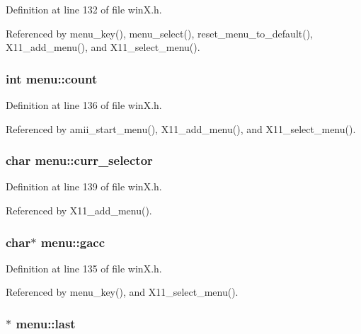Definition at line 132 of file win\+X.\+h.



Referenced by menu\+\_\+key(), menu\+\_\+select(), reset\+\_\+menu\+\_\+to\+\_\+default(), X11\+\_\+add\+\_\+menu(), and X11\+\_\+select\+\_\+menu().

\hypertarget{structmenu_a3d6c8d06c1b134f60244b4449a094d16}{
\subsubsection[{count}]{\setlength{\rightskip}{0pt plus 5cm}int menu\+::count}}\label{structmenu_a3d6c8d06c1b134f60244b4449a094d16}


Definition at line 136 of file win\+X.\+h.



Referenced by amii\+\_\+start\+\_\+menu(), X11\+\_\+add\+\_\+menu(), and X11\+\_\+select\+\_\+menu().

\hypertarget{structmenu_a06cdb274941f7ed31c60fc8e8389cd6b}{
\subsubsection[{curr\+\_\+selector}]{\setlength{\rightskip}{0pt plus 5cm}char menu\+::curr\+\_\+selector}}\label{structmenu_a06cdb274941f7ed31c60fc8e8389cd6b}


Definition at line 139 of file win\+X.\+h.



Referenced by X11\+\_\+add\+\_\+menu().

\hypertarget{structmenu_add1624fb9ee5a8b54a7c409af24d0318}{
\subsubsection[{gacc}]{ char$\ast$ menu\+::gacc}}\label{structmenu_add1624fb9ee5a8b54a7c409af24d0318}


Definition at line 135 of file win\+X.\+h.



Referenced by menu\+\_\+key(), and X11\+\_\+select\+\_\+menu().

\hypertarget{structmenu_aab6cdb5421f24c19a73e839de8351228}{
\subsubsection[{last}]{$\ast$ menu\+::last}}\label{structmenu_aab6cdb5421f24c19a73e839de8351228}


